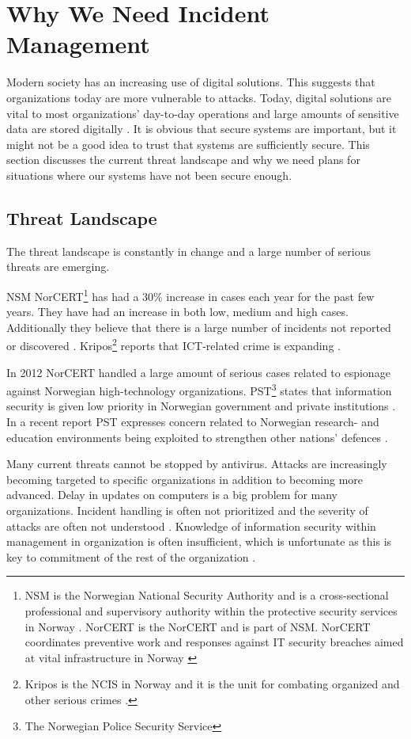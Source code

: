 \section{Why We Need Incident Management}
Modern society has an increasing use of digital solutions. This suggests that organizations today are more vulnerable to attacks. Today, digital solutions are vital to most organizations' day-to-day operations and large amounts of sensitive data are stored digitally \cite{KriposTrender}. It is obvious that secure systems are important, but it might not be a good idea to trust that systems are sufficiently secure.  This section discusses the current threat landscape and why we need plans for situations where our systems have not been secure enough.

\subsection{Threat Landscape}
The threat landscape is constantly in change and a large number of serious threats are emerging.

\acs{NSM} \acs{NorCERT}\footnote{\acs{NSM} is the Norwegian National Security Authority and is a cross-sectional professional and supervisory authority within the protective security services in Norway \cite{AboutNSM}. \acs{NorCERT} is the \acl{NorCERT} and is part of \acs{NSM}. \acs{NorCERT} coordinates preventive work and responses against IT security breaches aimed at vital infrastructure in Norway \cite{AboutNorCERT}} has had a 30\% increase in cases each year for the past few years. They have had an increase in both low, medium and high cases. Additionally they believe that there is a large number of incidents not reported or discovered \cite{NorCERT3Kvartal2012}. Kripos\footnote{Kripos is the \ac{NCIS} in Norway and it is the unit for combating organized and other serious crimes \cite{policeInNorway}.} reports that ICT-related crime is expanding \cite{KriposTrender}.

In 2012 \acs{NorCERT} handled a large amount of serious cases related to espionage against Norwegian high-technology organizations. PST\footnote{The Norwegian Police Security Service} states that information security is given low priority in Norwegian government and private institutions \cite{PSTvurdering}. In a recent report PST expresses concern related to Norwegian research- and education environments being exploited to strengthen other nations' defences \cite{PSTvurdering2013}.   

Many current threats cannot be stopped by antivirus. Attacks are increasingly becoming targeted to specific organizations in addition to becoming more advanced. Delay in updates on computers is a big problem for many organizations. Incident handling is often not prioritized and the severity of attacks are often not understood \cite{NorCERT2Kvartal2012}. Knowledge of information security within management in organization is often insufficient, which is unfortunate as this is key to commitment of the rest of the organization \cite{NorCERT3Kvartal2012}. 

